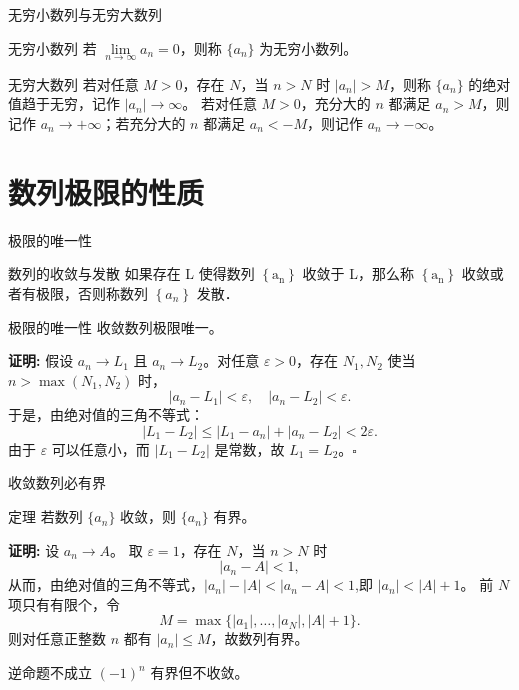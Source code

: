 \documentclass[aspectratio=169,10pt]{ctexbeamer}
\begin{document}
\begin{frame}{无穷小数列与无穷大数列}

  
  \begin{block}{无穷小数列}
    若 \(\lim\limits_{n\to\infty} a_n = 0\)，则称 \(\{a_n\}\) 为无穷小数列。
  \end{block}
  \vspace{0.7cm}
  \begin{block}{无穷大数列}
    若对任意 \(M>0\)，存在 \(N\)，当 \(n>N\) 时 \(|a_n|>M\)，则称 \(\{a_n\}\) 的绝对值趋于无穷，记作 \(|a_n|\to\infty\)。
    若对任意 \(M>0\)，充分大的 \(n\) 都满足 \(a_n>M\)，则记作 \(a_n\to+\infty\)；若充分大的 \(n\) 都满足 \(a_n<-M\)，则记作 \(a_n\to-\infty\)。
  \end{block}
  
\end{frame}





\section{数列极限的性质}



\begin{frame}{极限的唯一性}
  \small
  \begin{block}{数列的收敛与发散}
  	如果存在 L 使得数列 $\left\{\mathrm{a}_{\mathrm{n}}\right\}$ 收敛于 L，那么称 $\left\{\mathrm{a}_{\mathrm{n}}\right\}$ 收敛或者有极限，否则称数列 $\left\{a_n\right\}$ 发散．
  \end{block}
  \begin{block}{极限的唯一性}
    	收敛数列极限唯一。
  \end{block}
  \textbf{证明:}
    	假设 \(a_n \to L_1\) 且 \(a_n \to L_2\)。对任意 \(\varepsilon > 0\)，存在 \(N_1, N_2\) 使当 \(n > \max(N_1, N_2)\) 时，
    \[
    |a_n - L_1| < \varepsilon,\quad |a_n - L_2| < \varepsilon.
    \]
    于是，由绝对值的三角不等式：
    \[
    |L_1 - L_2| \leq |L_1 - a_n| + |a_n - L_2| < 2\varepsilon.
    \]
    由于 \(\varepsilon\) 可以任意小，而 \(|L_1 - L_2|\) 是常数，故 \(L_1 = L_2\)。\(\square\)

\end{frame}

\begin{frame}{收敛数列必有界}
  \small
  \begin{block}{定理}
    若数列 $\{a_n\}$ 收敛，则 $\{a_n\}$ 有界。
  \end{block}
  \textbf{证明:}
    设 $a_n\to A$。 取 $\varepsilon=1$，存在 $N$，当 $n>N$ 时
    \[
    |a_n-A|<1,
    \]
    从而，由绝对值的三角不等式，$\left| {{a_n}} \right| - \left| A \right| < \left| {{a_n} - A} \right| < 1$,即 $|a_n|<|A|+1$。 前 $N$ 项只有有限个，令
    \[
    M=\max\{|a_1|,\ldots,|a_N|,|A|+1\}.
    \]
    则对任意正整数 $n$ 都有 $|a_n|\le M$，故数列有界。
 
  \begin{alertblock}{逆命题不成立}
    $(-1)^n$ 有界但不收敛。
  \end{alertblock}
\end{frame}
\end{document}
